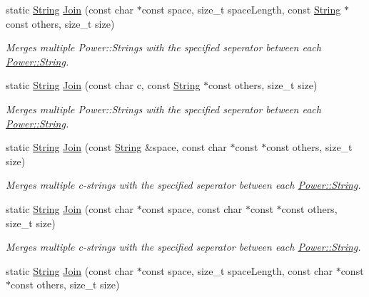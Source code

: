 \begin{DoxyCompactItemize}
static \hyperlink{class_power_1_1_string}{String} \hyperlink{class_power_1_1_string_a02c5be6d0651772dc591dba906dded7d}{Join} (const char $\ast$const space, size\+\_\+t space\+Length, const \hyperlink{class_power_1_1_string}{String} $\ast$const others, size\+\_\+t size)
\begin{DoxyCompactList}\small\item\em Merges multiple Power\+::\+Strings with the specified seperator between each \hyperlink{class_power_1_1_string}{Power\+::\+String}. \end{DoxyCompactList}\item 
static \hyperlink{class_power_1_1_string}{String} \hyperlink{class_power_1_1_string_a509a15ecf870d362b2b7c7fb775c785b}{Join} (const char c, const \hyperlink{class_power_1_1_string}{String} $\ast$const others, size\+\_\+t size)
\begin{DoxyCompactList}\small\item\em Merges multiple Power\+::\+Strings with the specified seperator between each \hyperlink{class_power_1_1_string}{Power\+::\+String}. \end{DoxyCompactList}\item 
static \hyperlink{class_power_1_1_string}{String} \hyperlink{class_power_1_1_string_a582be11833bb084d9dbf456b792e1eee}{Join} (const \hyperlink{class_power_1_1_string}{String} \&space, const char $\ast$const $\ast$const others, size\+\_\+t size)
\begin{DoxyCompactList}\small\item\em Merges multiple c-\/strings with the specified seperator between each \hyperlink{class_power_1_1_string}{Power\+::\+String}. \end{DoxyCompactList}\item 
static \hyperlink{class_power_1_1_string}{String} \hyperlink{class_power_1_1_string_a1fbd780649df6b1acebccfe1c9a6e82f}{Join} (const char $\ast$const space, const char $\ast$const $\ast$const others, size\+\_\+t size)
\begin{DoxyCompactList}\small\item\em Merges multiple c-\/strings with the specified seperator between each \hyperlink{class_power_1_1_string}{Power\+::\+String}. \end{DoxyCompactList}\item 
static \hyperlink{class_power_1_1_string}{String} \hyperlink{class_power_1_1_string_a8917e8a49ba975d5cdbb5ef2c407ccaa}{Join} (const char $\ast$const space, size\+\_\+t space\+Length, const char $\ast$const $\ast$const others, size\+\_\+t size)

\end{DoxyCompactItemize}
